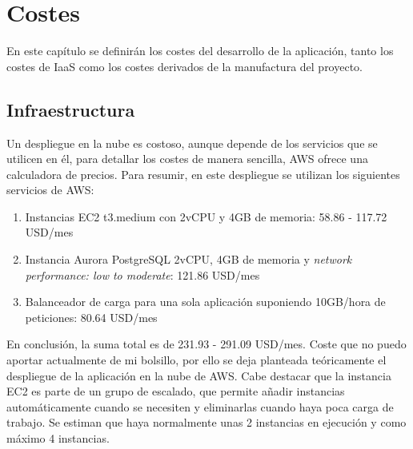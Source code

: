 \chapter{Costes}
En este capítulo se definirán los costes del desarrollo de la aplicación, tanto los costes de IaaS como los costes derivados de la manufactura del proyecto.

\section{Infraestructura}
Un despliegue en la nube es costoso, aunque depende de los servicios que se utilicen en él, para detallar los costes de manera sencilla, AWS ofrece una calculadora de precios. Para resumir, en este despliegue se utilizan los siguientes servicios de AWS:
\begin{enumerate}
    \item Instancias EC2 t3.medium con 2vCPU y 4GB de memoria: 58.86 - 117.72 USD/mes
    \item Instancia Aurora PostgreSQL 2vCPU, 4GB de memoria y \emph{network performance: low to moderate}: 121.86 USD/mes
    \item Balanceador de carga para una sola aplicación suponiendo 10GB/hora de peticiones: 80.64 USD/mes
\end{enumerate}

En conclusión, la suma total es de 231.93 - 291.09 USD/mes. Coste que no puedo aportar actualmente de mi bolsillo, por ello se deja planteada teóricamente el despliegue de la aplicación en la nube de AWS. Cabe destacar que la instancia EC2 es parte de un grupo de escalado, que permite añadir instancias automáticamente cuando se necesiten y eliminarlas cuando haya poca carga de trabajo. Se estiman que haya normalmente unas 2 instancias en ejecución y como máximo 4 instancias.
